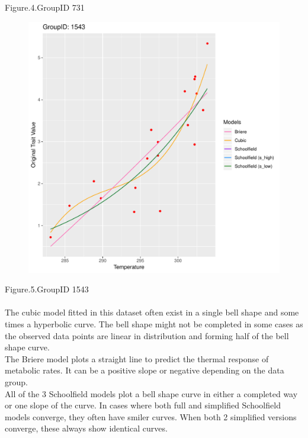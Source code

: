 \documentclass[12pt,a4paper]{article}
\begin{document}
Figure.4.GroupID 731
\\
\begin{figure}[H]
\centering
\includegraphics[width=\textwidth]{example5.pdf}
\end{figure}
Figure.5.GroupID 1543
\\
\\
The cubic model fitted in this dataset often exist in a single bell shape and some times a hyperbolic curve. The bell shape might not be completed in some cases as the observed data points are linear in distribution and forming half of the bell shape curve.
\\
The Briere model plots a straight line to predict the thermal response of metabolic rates. It can be a positive slope or negative depending on the data group.
\\
All of the 3 Schoolfield models plot a bell shape curve in either a completed way or one slope of the curve. In cases where both full and simplified Schoolfield models converge, they often have smiler curves. When both 2 simplified versions converge, these always show identical curves.
\end{document}
